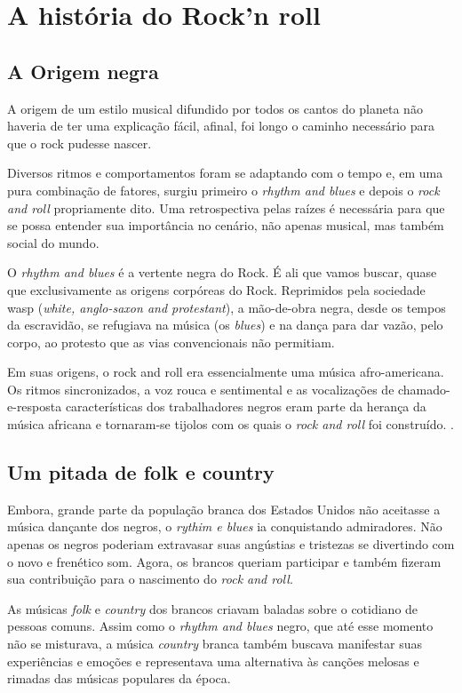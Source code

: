 \chapter{A história do Rock'n roll}

\section{A Origem negra}


A origem de um estilo musical difundido por todos os cantos do planeta não 
haveria de ter uma 
explicação fácil, afinal, foi longo o caminho necessário para que o rock pudesse nascer.

Diversos ritmos e comportamentos foram se adaptando com o tempo e, em uma pura combinação de 
fatores, surgiu primeiro o {\it rhythm and blues} e depois o {\it rock and roll} propriamente 
dito. Uma retrospectiva pelas raízes é necessária para que se possa entender sua importância no 
cenário, não apenas musical, mas também social do mundo.

O {\it rhythm and blues} é a vertente negra do Rock. É ali que vamos buscar, quase que exclusivamente 
as origens corpóreas do Rock. Reprimidos pela sociedade wasp ({\it white, anglo-saxon and protestant}), 
a mão-de-obra negra, desde os tempos da escravidão, se refugiava na música (os {\it blues}) e na dança 
para dar vazão, pelo corpo, ao protesto que as vias convencionais não permitiam. \cite{CHA1985}

Em suas origens, o rock and roll era essencialmente uma música afro-americana. Os ritmos 
sincronizados, a voz rouca e sentimental e as vocalizações de chamado-e-resposta características dos 
trabalhadores negros eram parte da herança da música africana e tornaram-se tijolos com os quais o 
{\it rock and roll} foi construído. \cite{FRI1996}.

\section{Um pitada de folk e country}

Embora, grande parte da população branca dos Estados Unidos não aceitasse a música dançante dos 
negros, o {\it rythim e blues} ia conquistando admiradores. Não apenas os negros poderiam extravasar suas 
angústias e 
tristezas se divertindo com o novo e frenético som. Agora, os brancos queriam participar e também 
fizeram sua contribuição para o nascimento do {\it rock and roll}.

As músicas {\it folk} e {\it country} dos brancos criavam baladas sobre o cotidiano de pessoas comuns. 
Assim 
como o {\it rhythm and blues} negro, que até esse momento não se misturava, a música {\it country} branca 
também 
buscava 
manifestar suas experiências e emoções e representava uma alternativa às canções melosas e rimadas 
das músicas populares da época.

